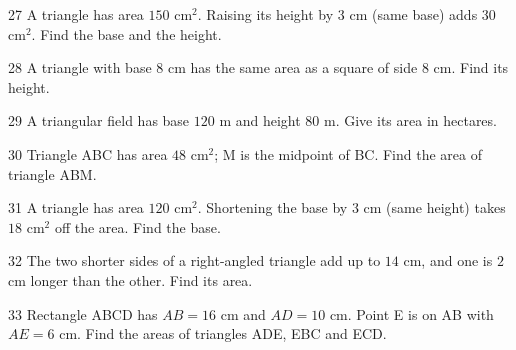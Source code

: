 \gap
\begin{probbox}{27}{\relax}
A triangle has area $150$ cm$^2$. Raising its height by $3$ cm (same base) adds $30$ cm$^2$. Find the base and the height.
\end{probbox}
\gap
\begin{probbox}{28}{\relax}
A triangle with base $8$ cm has the same area as a square of side $8$ cm. Find its height.
\end{probbox}
\gap
\begin{probbox}{29}{\relax}
A triangular field has base $120$ m and height $80$ m. Give its area in hectares.
\end{probbox}
\gap
\begin{probbox}{30}{\relax}
Triangle ABC has area $48$ cm$^2$; M is the midpoint of BC. Find the area of triangle ABM.
\end{probbox}
\begin{probbox}{31}{}
A triangle has area $120$ cm$^2$. Shortening the base by $3$ cm (same height) takes $18$ cm$^2$ off the area. Find the base.
\end{probbox}
\gap
\begin{probbox}{32}{}
The two shorter sides of a right-angled triangle add up to $14$ cm, and one is $2$ cm longer than the other. Find its area.
\end{probbox}
\gap
\begin{probbox}{33}{}
Rectangle ABCD has $AB=16$ cm and $AD=10$ cm. Point E is on AB with $AE=6$ cm. Find the areas of triangles ADE, EBC and ECD.
\end{probbox}
